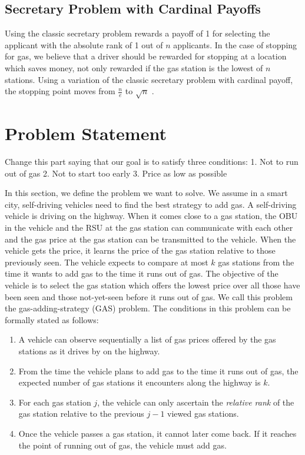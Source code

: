 \documentclass[conference]{IEEEtran}
\theoremstyle{definition}
\begin{document}
\subsection{Secretary Problem with Cardinal Payoffs}
Using the classic secretary problem rewards a payoff of 1 for selecting the applicant with the absolute rank of 1 out of $n$ applicants. In the case of stopping for gas, we believe that a driver should be rewarded for stopping at a location which saves money, not only rewarded if the gas station is the lowest of $n$ stations. Using a variation of the classic secretary problem with cardinal payoff, the stopping point moves from $\frac{n}{e}$ to $\sqrt{n}$ \cite{ferenstein:hal-00602313}.

\section{Problem Statement} \label{problem}
{\color{red} Change this part saying that our goal is to satisfy three conditions:
1. Not to run out of gas 2. Not to start too early 3. Price as low as possible }

In this section, we define the problem we want to solve. We assume in a smart city, self-driving vehicles need to find the best strategy to add gas. A self-driving vehicle is driving on the highway. When it comes close to a gas station, the OBU in the vehicle and the RSU at the gas station can communicate with each other and the gas price at the gas station can be transmitted to the vehicle. When the vehicle gets the price, it learns the price of the gas station relative to those previously seen. The vehicle expects to compare at most $k$ gas stations from the time it wants to add gas to the time it runs out of gas. The objective of the vehicle is to select the gas station which offers the lowest price over all those have been seen and those not-yet-seen before it runs out of gas. We call this problem the gas-adding-strategy (GAS) problem. The conditions in this problem can be formally stated as follows:

\begin{enumerate}
\item A vehicle can observe sequentially a list of gas prices offered by the gas stations as it drives by on the highway.
\item From the time the vehicle plans to add gas to the time it runs out of gas, the expected number of gas stations it encounters along the highway is $k$.
\item For each gas station $j$, the vehicle can only ascertain the {\em relative rank} of the gas station relative to the previous $j-1$ viewed gas stations.
\item Once the vehicle passes a gas station, it cannot later come back. If it reaches the point of running out of gas, the vehicle must add gas.
\end{enumerate}
\end{document}
